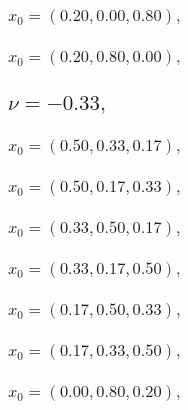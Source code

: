 \documentclass[a4paper]{article}
\begin{document}
\begin{multicols*}{2}
   \subsubsection{\(x_0 = (0.20,0.00,0.80),\quad \)}
   

   \subsubsection{\(x_0 = (0.20,0.80,0.00),\quad \)}
   

   \subsection{\(\nu = -0.33,\quad \)}
   

   \subsubsection{\(x_0 = (0.50,0.33,0.17),\quad \)}
   

   \subsubsection{\(x_0 = (0.50,0.17,0.33),\quad \)}
   

   \subsubsection{\(x_0 = (0.33,0.50,0.17),\quad \)}
   

   \subsubsection{\(x_0 = (0.33,0.17,0.50),\quad \)}
   

   \subsubsection{\(x_0 = (0.17,0.50,0.33),\quad \)}
   

   \subsubsection{\(x_0 = (0.17,0.33,0.50),\quad \)}
   

   \subsubsection{\(x_0 = (0.00,0.80,0.20),\quad \)}
   


\end{multicols*}
\end{document}
